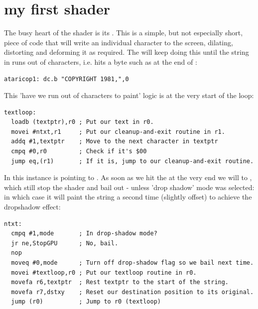 \chapter{my first shader}
\label{sec:listing}
\lstset{style=68KStyle}

The busy heart of the  shader is its . This is a simple, but not especially short, piece of code that
will write an individual character to the screen, dilating, distorting and deforming it as required. The  will
keep doing this until the string in  runs out of characters, i.e. hits a  byte such as at the end of
:

\begin{lstlisting}
ataricop1: dc.b "COPYRIGHT 1981,",0
\end{lstlisting}

This 'have we run out of characters to paint' logic is at the very start of the loop:

\begin{lstlisting}
textloop:
  loadb (textptr),r0 ; Put our text in r0.
  movei #ntxt,r1     ; Put our cleanup-and-exit routine in r1.
  addq #1,textptr    ; Move to the next character in textptr
  cmpq #0,r0         ; Check if it's $00
  jump eq,(r1)       ; If it is, jump to our cleanup-and-exit routine.
\end{lstlisting}

In this instance  is pointing to . As soon as we hit the  at the very end we will
 to , which still stop the shader and bail out - unless 'drop shadow' mode was selected: in which
case it will paint the string a second time (slightly offset) to achieve the dropshadow effect:

\begin{lstlisting}[caption=In fact there is no offset for drop-shadow mode implemented\, so the feature is unused.  I suspect this is because the code is copy-pasted from elsewhere\,
as we shall encounter a cousin of this routine later on.]
ntxt:
  cmpq #1,mode       ; In drop-shadow mode?
  jr ne,StopGPU      ; No, bail.
  nop
  moveq #0,mode      ; Turn off drop-shadow flag so we bail next time.
  movei #textloop,r0 ; Put our textloop routine in r0.
  movefa r6,textptr  ; Rest textptr to the start of the string.
  movefa r7,dstxy    ; Reset our destination position to its original.
  jump (r0)          ; Jump to r0 (textloop)
\end{lstlisting}


